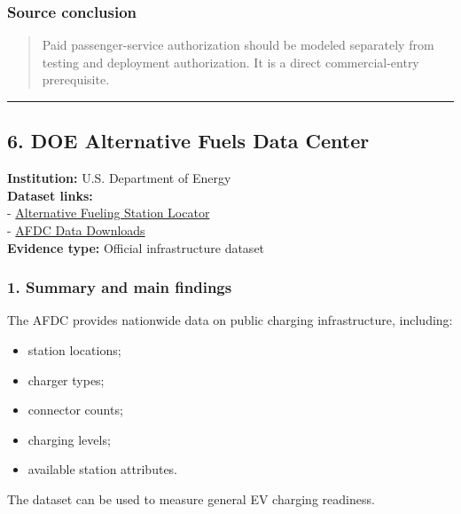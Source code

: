 \documentclass[10pt,a4paper]{article}
\providecommand{\tightlist}{\setlength{\itemsep}{0pt}\setlength{\parskip}{0pt}}
\begin{document}
\hypertarget{source-conclusion-2}{%
\subsubsection{Source conclusion}\label{source-conclusion-2}}

\begin{quote}
Paid passenger-service authorization should be modeled separately from testing and deployment authorization. It is a direct commercial-entry prerequisite.
\end{quote}

\begin{center}\rule{0.5\linewidth}{0.5pt}\end{center}

\hypertarget{doe-alternative-fuels-data-center}{%
\subsection{6. DOE Alternative Fuels Data Center}\label{doe-alternative-fuels-data-center}}

\textbf{Institution:} U.S. Department of Energy\\
\textbf{Dataset links:}\\
- \href{https://afdc.energy.gov/stations/}{Alternative Fueling Station Locator}\\
- \href{https://afdc.energy.gov/data_download}{AFDC Data Downloads}\\
\textbf{Evidence type:} Official infrastructure dataset

\hypertarget{summary-and-main-findings-3}{%
\subsubsection{1. Summary and main findings}\label{summary-and-main-findings-3}}

The AFDC provides nationwide data on public charging infrastructure, including:

\begin{itemize}
\tightlist
\item
  station locations;
\item
  charger types;
\item
  connector counts;
\item
  charging levels;
\item
  available station attributes.
\end{itemize}

The dataset can be used to measure general EV charging readiness.
\end{document}
